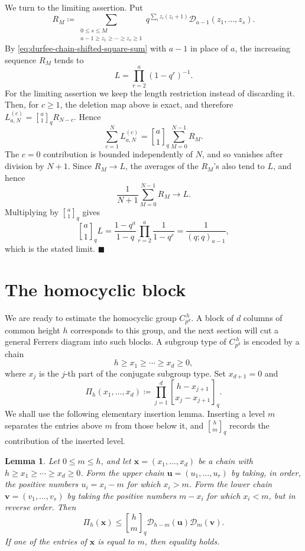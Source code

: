 \documentclass[a4paper,11pt,reqno]{amsart}
\theoremstyle{plain}
\newtheorem{lemma}[theorem]{Lemma}
\theoremstyle{remark}
\numberwithin{equation}{section}
\newcommand{\qgauss}[2]{\genfrac{[}{]}{0pt}{}{#1}{#2}_q}
\renewcommand{\leq}{\leqslant}
\renewcommand{\geq}{\geqslant}
\newenvironment{proofof}{{\bf Proof. }}{\hfill $\blacksquare$ \\}
\begin{document}
\begin{proofof}
We turn to the limiting assertion. Put
\[
        R_M\coloneqq
        \sum_{\substack{0\leq s\leq M\\ a-1\geq z_1\geq\cdots\geq z_s\geq 1}}
        q^{\sum_i z_i(z_i+1)}\mathcal D_{a-1}(z_1,\ldots,z_s).
\]
By \eqref{eq:durfee-chain-shifted-square-sum} with $a-1$ in place of $a$,
the increasing sequence $R_M$ tends to
\[
        L=\prod_{r=2}^a(1-q^r)^{-1}.
\]
For the limiting assertion we keep the length restriction instead of discarding
it. Then, for $c\geq 1$, the deletion map above is exact, and therefore
$L_{a,N}^{(c)}=\qgauss{a}{1}R_{N-c}$. Hence
\[
        \sum_{c=1}^N L_{a,N}^{(c)}
        =
        \qgauss{a}{1}\sum_{M=0}^{N-1}R_M.
\]
The $c=0$ contribution is bounded independently of $N$, and so vanishes
after division by $N+1$. 
Since $R_M\to L$, the averages of the $R_M$'s also tend to $L$, and hence
\[
        \frac{1}{N+1}\sum_{M=0}^{N-1}R_M \longrightarrow L.
\]
Multiplying by $\qgauss{a}{1}$ gives
\[
        \qgauss{a}{1}L
        =
        \frac{1-q^a}{1-q}\prod_{r=2}^a\frac{1}{1-q^r}
        =
        \frac{1}{(q;q)_{a-1}},
\]
which is the stated limit.
\end{proofof}

\section{The homocyclic block}
\label{sec:homocyclic}

We are ready to estimate the homocyclic group $C_{p^d}^{\,h}$. A block of $d$ columns
of common height $h$ corresponds to this group, and the next section will cut a
general Ferrers diagram into such blocks. A subgroup type of $C_{p^d}^{\,h}$ is
encoded by a chain
\[
        h\geq x_1\geq\cdots\geq x_d\geq 0,
\]
where $x_j$ is the $j$-th part of the conjugate subgroup type. Set
$x_{d+1}=0$ and
\[
        \Pi_h(x_1,\ldots,x_d)\coloneqq
        \prod_{j=1}^{d}
        \qgauss{h-x_{j+1}}{x_j-x_{j+1}}.
\]
We shall use the following elementary insertion lemma. Inserting a level $m$
separates the entries above $m$ from those below it, and $\qgauss{h}{m}$
records the contribution of the inserted level.

\begin{lemma}\label{lem:middle-insertion}
Let $0\leq m\leq h$, and let
$\mathbf x=(x_1,\ldots,x_d)$ be a chain with
$h\geq x_1\geq\cdots\geq x_d\geq 0$. Form the upper chain
$\mathbf u=(u_1,\ldots,u_r)$ by taking, in order, the positive numbers
$u_i=x_i-m$ for which $x_i>m$. Form the lower chain
$\mathbf v=(v_1,\ldots,v_s)$ by taking the positive numbers $m-x_i$ for which
$x_i<m$, but in reverse order. Then
\[
        \Pi_h(\mathbf x)
        \leq
        \qgauss{h}{m}\mathcal D_{h-m}(\mathbf u)\mathcal D_m(\mathbf v).
\]
If one of the entries of $\mathbf x$ is equal to $m$, then equality holds.
\end{lemma}
\end{document}
